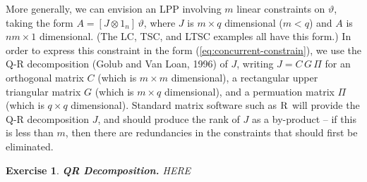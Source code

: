 \documentclass[a4paper]{book}
\newtheorem{Exercise}{Exercise}
\begin{document}
 More generally, we can envision an LPP involving $m$ linear constraints on 
  $\vartheta$, taking the form
 $   A = [ J \otimes 1_n ] \, \vartheta$, where $J$ is $m \times q$ 
 dimensional ($m < q$) and $A$ is $n m \times 1$ dimensional.
 (The LC, TSC, and LTSC examples all have this form.)  In order to express 
 this constraint in the form 
 (\ref{eq:concurrent-constrain}), we use the Q-R decomposition 
 (Golub and Van Loan, 1996) of $J$, writing
 $J = C \, G \, \Pi$ for an orthogonal matrix $C$ (which is $m \times m$ dimensional),
 a rectangular upper triangular matrix $G$
 (which is $m \times q$ dimensional), and a permuation matrix $\Pi$ 
 (which is $q \times q$ dimensional).  
 Standard matrix software such as $\textsc{R}$ will provide the Q-R decomposition $J$,
 and should produce the rank of $J$ as  a by-product --
 if this is less than $m$, then there are redundancies in the 
 constraints that should first be eliminated. 
 
 \begin{Exercise} {\bf QR Decomposition.} \rm
 \label{exer:qr.constraint}
 HERE
 \end{Exercise}
 
\end{document}
